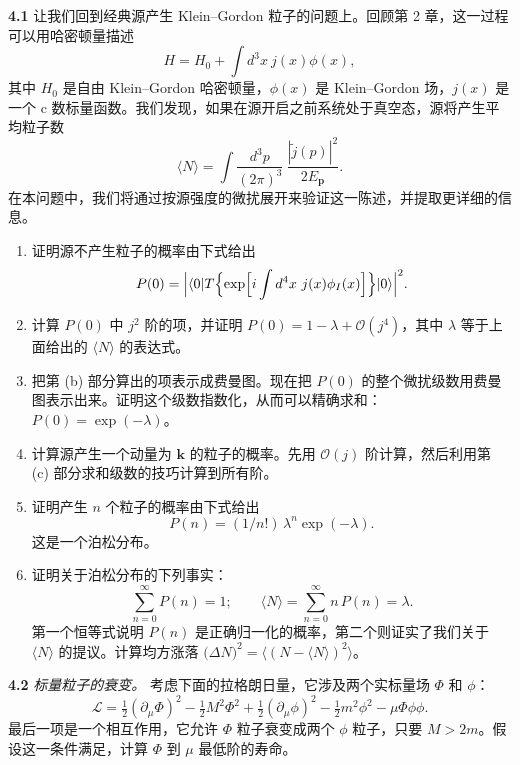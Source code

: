\textbf{4.1} 让我们回到经典源产生 Klein--Gordon 粒子的问题上。回顾第 2 章，这一过程可以用哈密顿量描述
\begin{equation}
  H = H_0 + \int d^3x\ j(x)\phi(x) ,
\end{equation}
其中 $H_0$ 是自由 Klein--Gordon 哈密顿量，$\phi(x)$ 是 Klein--Gordon 场，$j(x)$ 是一个 c 数标量函数。我们发现，如果在源开启之前系统处于真空态，源将产生平均粒子数
\begin{equation}
  \langle N\rangle = \int \frac{d^3p}{(2\pi)^3}\
    \frac{|\tilde{j}(p)|^2}{2E_{\mathbf{p}}} .
\end{equation}
在本问题中，我们将通过按源强度的微扰展开来验证这一陈述，并提取更详细的信息。
\begin{enumerate}[label=(\alph*)]
  \item 证明源不产生粒子的概率由下式给出
    \begin{equation}
      P(0) = \Bigl| \langle 0|T\Bigl\{ \exp\Bigl[ i\int d^4x\
        j(x)\phi_I(x) \Bigr] \Bigr\}|0\rangle \Bigr|^2 .
    \end{equation}
  \item 计算 $P(0)$ 中 $j^2$ 阶的项，并证明 $P(0) = 1 - \lambda + \mathcal{O}(j^4)$，其中 $\lambda$ 等于上面给出的 $\langle N\rangle$ 的表达式。
  \item 把第 (b) 部分算出的项表示成费曼图。现在把 $P(0)$ 的整个微扰级数用费曼图表示出来。证明这个级数指数化，从而可以精确求和：$P(0) = \exp(-\lambda)$。
  \item 计算源产生一个动量为 $\mathbf{k}$ 的粒子的概率。先用 $\mathcal{O}(j)$ 阶计算，然后利用第 (c) 部分求和级数的技巧计算到所有阶。
  \item 证明产生 $n$ 个粒子的概率由下式给出
    \begin{equation}
      P(n) = (1/n!)\,\lambda^n\exp(-\lambda) .
    \end{equation}
    这是一个泊松分布。
  \item 证明关于泊松分布的下列事实：
    \begin{equation}
      \sum_{n=0}^{\infty}P(n) = 1;\qquad
      \langle N\rangle = \sum_{n=0}^{\infty} n\,P(n) = \lambda .
    \end{equation}
    第一个恒等式说明 $P(n)$ 是正确归一化的概率，第二个则证实了我们关于 $\langle N\rangle$ 的提议。计算均方涨落 $\bigl( \Delta N \bigr)^2 = \langle (N - \langle N\rangle)^2 \rangle$。
\end{enumerate}

\textbf{4.2} \emph{标量粒子的衰变。} 考虑下面的拉格朗日量，它涉及两个实标量场 $\Phi$ 和 $\phi$：
\begin{equation}
  \mathcal{L} = \tfrac{1}{2}(\partial_\mu\Phi)^2 - \tfrac{1}{2}M^2\Phi^2
    + \tfrac{1}{2}(\partial_\mu\phi)^2 - \tfrac{1}{2}m^2\phi^2
    - \mu\Phi\phi\phi .
\end{equation}
最后一项是一个相互作用，它允许 $\Phi$ 粒子衰变成两个 $\phi$ 粒子，只要 $M > 2m$。假设这一条件满足，计算 $\Phi$ 到 $\mu$ 最低阶的寿命。

